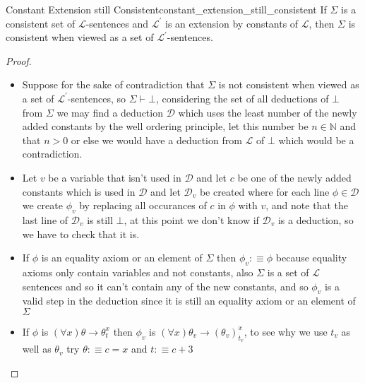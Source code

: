 \begin{lemma}{Constant Extension still Consistent}{constant_extension_still_consistent}
If $\Sigma$ is a consistent set of $\mathcal{L}$-sentences and $\mathcal{L}^{\prime}$ is an extension by constants of $\mathcal{L}$, then $\Sigma$ is consistent when viewed as a set of $\mathcal{L}^{\prime}$-sentences.
\end{lemma}
\begin{proof}
    \begin{itemize}
        \item Suppose for the sake of contradiction that $ \Sigma  $ is not consistent when viewed as a set of $\mathcal{L}^{\prime}$-sentences, so $ \Sigma \vdash \bot $, considering the set of all deductions of $ \bot  $ from $ \Sigma  $ we may find a deduction $ \mathcal{ D }   $  which uses the least number of the newly added constants by the well ordering principle, let this number be $ n \in  \mathbb{N} $ and that $ n > 0 $ or else we would have a deduction from $ \mathcal{ L }   $ of $ \bot  $ which would be a contradiction.
        \item Let $ v $ be a variable that isn't used in $ \mathcal{ D }   $ and let $ c $ be one of the newly added constants which is used in $ \mathcal{ D }   $ and let $ \mathcal{ D } _{ v }   $ be created where for each line $ \phi \in  \mathcal{ D }  $ we create $ \phi _{ v }  $ by replacing all occurances of $ c $ in $ \phi  $ with $ v $, and note that the last line of $ \mathcal{ D } _{ v }   $ is still $ \bot  $, at this point we don't know if $ \mathcal{ D } _{ v }   $ is a deduction, so we have to check that it is.
        \item If $ \phi  $ is an equality axiom or an element of $ \Sigma $ then $ \phi _{ v } :\equiv \phi  $ because equality axioms only contain variables and not constants, also $ \Sigma  $ is a set of $ \mathcal{ L }   $ sentences and so it can't contain any of the new constants, and so $ \phi _{ v }  $ is a valid step in the deduction since it is still an equality axiom or an element of $ \Sigma  $ 
        \item If $ \phi  $ is $ \left( \forall x \right) \theta \rightarrow \theta _{ t }^{ x }  $ then $ \phi _{ v }  $ is $ \left( \forall x \right)\theta _{ v } \rightarrow \left( \theta _{ v }  \right) _{ t _{ v }  }^{ x  }  $, to see why we use $ t _{ v }  $ as well as $ \theta _{ v }  $ try $ \theta :\equiv c =  x $ and $ t :\equiv   c + 3 $ 
    \end{itemize}
\end{proof}
